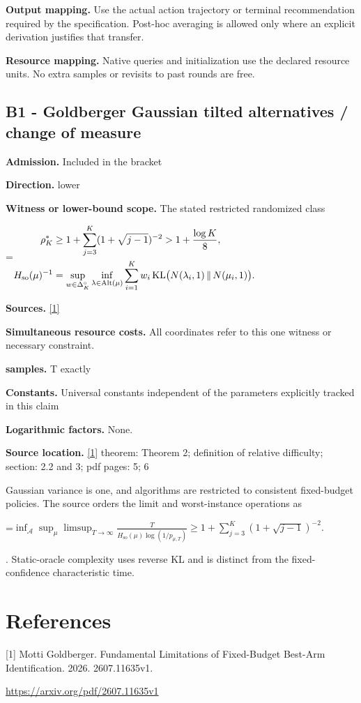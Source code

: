 \documentclass[10pt,a4paper]{article}
\newcommand{\AtlasMath}[1]{\par\begingroup\centering\setbox0=\hbox{$\displaystyle #1$}\ifdim\wd0>1.4\linewidth\typeout{ATLAS WIDE FORMULA: \the\wd0}\fi\ifdim\wd0>\linewidth\resizebox{\linewidth}{!}{\box0}\else\box0\fi\par\endgroup}
\begin{document}
\textbf{Output mapping.} Use the actual action trajectory or terminal recommendation required by the specification. Post-hoc averaging is allowed only where an explicit derivation justifies that transfer.

\textbf{Resource mapping.} Native queries and initialization use the declared resource units. No extra samples or revisits to past rounds are free.

\subsection{B1 - Goldberger Gaussian tilted alternatives / change of measure}
\textbf{Admission.} Included in the bracket

\textbf{Direction.} lower

\textbf{Witness or lower-bound scope.} The stated restricted randomized class

\AtlasMath{\begin{aligned}[c]\rho_K^*&\ge1+\sum_{j=3}^K(1+\sqrt{j-1})^{-2}>1+\frac{\log K}{8},\\ H_{\rm so}(\mu)^{-1}&=\sup_{w\in\Delta_K^\circ}\inf_{\lambda\in\operatorname{Alt}(\mu)}\sum_{i=1}^K w_i\operatorname{KL}\bigl(N(\lambda_i,1)\,\|\,N(\mu_i,1)\bigr).\end{aligned}}
\textbf{Sources.} \href{https://arxiv.org/pdf/2607.11635v1}{[1]}

\textbf{Simultaneous resource costs.} All coordinates refer to this one witness or necessary constraint.

\textbf{samples.} T exactly

\textbf{Constants.} Universal constants independent of the parameters explicitly tracked in this claim

\textbf{Logarithmic factors.} None.

\textbf{Source location.} \href{https://arxiv.org/pdf/2607.11635v1}{[1]} theorem: Theorem 2; definition of relative difficulty; section: 2.2 and 3; pdf pages: 5; 6

Gaussian variance is one, and algorithms are restricted to consistent fixed-budget policies. The source orders the limit and worst-instance operations as 
\AtlasMath{\inf_{\mathcal A}\sup_\mu\limsup_{T\to\infty}\frac{T}{H_{\mathrm{so}}(\mu)\log(1/p_{\mu,T})}\ge1+\sum_{j=3}^K(1+\sqrt{j-1})^{-2}.}
. Static-oracle complexity uses reverse KL and is distinct from the fixed-confidence characteristic time.

\section{References}
[1] Motti Goldberger. Fundamental Limitations of Fixed-Budget Best-Arm Identification. 2026. 2607.11635v1.

\url{https://arxiv.org/pdf/2607.11635v1}
\end{document}
